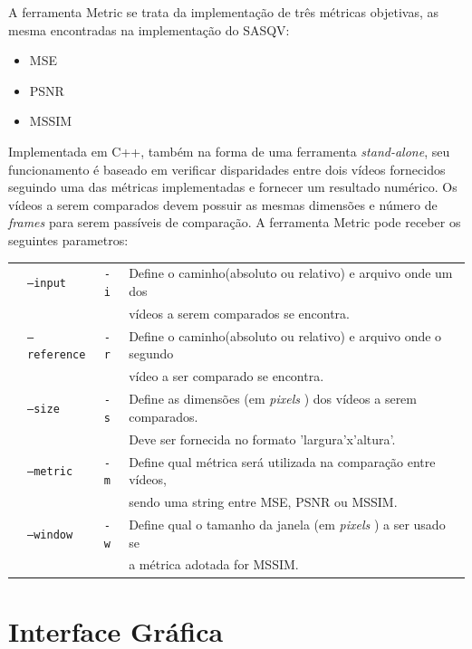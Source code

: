 A ferramenta Metric se trata da implementação de três métricas objetivas, as mesma encontradas na implementação do SASQV:

\begin{itemize}
	\item MSE
	\item PSNR
	\item MSSIM
\end{itemize}

Implementada em C++, também na forma de uma ferramenta \emph{stand-alone}, seu funcionamento é baseado em verificar disparidades entre dois vídeos fornecidos seguindo uma das métricas implementadas e fornecer um resultado numérico. 
Os vídeos a serem comparados devem possuir as mesmas dimensões e número de \emph{frames} para serem passíveis de comparação. 
A ferramenta Metric pode receber os seguintes parametros:

\begin{table}[!h]
	\begin{tabular}{llll}
	& \texttt{--input} & \texttt{-i} & Define o caminho(absoluto ou relativo) e arquivo onde um dos \\ 
	& & & vídeos a serem comparados se encontra. \\
	& \texttt{--reference} & \texttt{-r} & Define o caminho(absoluto ou relativo) e arquivo onde o segundo \\
	& & & vídeo a ser comparado se encontra. \\
	& \texttt{--size} & \texttt{-s} & Define as dimensões (em \emph{pixels} ) dos vídeos a serem comparados. \\ 
	& & & Deve ser fornecida no formato 'largura'x'altura'. \\
	& \texttt{--metric} & \texttt{-m} & Define qual métrica será utilizada na comparação entre vídeos, \\
	& & & sendo uma string entre MSE, PSNR ou MSSIM. \\
	& \texttt{--window} & \texttt{-w} & Define qual o tamanho da janela (em \emph{pixels} ) a ser usado se \\ 
	& & & a métrica adotada for MSSIM. \\
	\end{tabular}
\end{table}

\section{Interface Gráfica}

